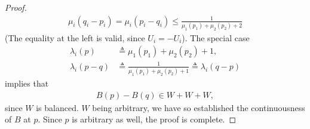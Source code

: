 \begin{proof}
\begin{align}
  \mu_i(q_i -p_i) = \mu_i(p_i -q_i) \leq \frac{1}{\mu_1(p_1)+\mu_2(p_2)+2} 
\end{align}
(The equality at the left is valid, since $U_i = -U_i$). %
The special case %
\begin{align}
  \lambda_i(p)   &\triangleq  \mu_1(p_1) + \mu_2(p_2) + 1, \\
  \lambda_i(p-q) &\triangleq  \frac{1}{\mu_1(p_1) + \mu_2(p_2) + 1} %
    \triangleq  \lambda_i(q-p) 
\end{align}
implies that %
%
\begin{align}
  B(p) - B(q)  \in W + W+ W, 
\end{align}    
%
since $W$ is balanced. %
%
$W$ being arbitrary, we have so established the continuousness of $B$ at %
$p$. %
Since $p$ is arbitrary as well, the proof is complete.
\end{proof}
%
